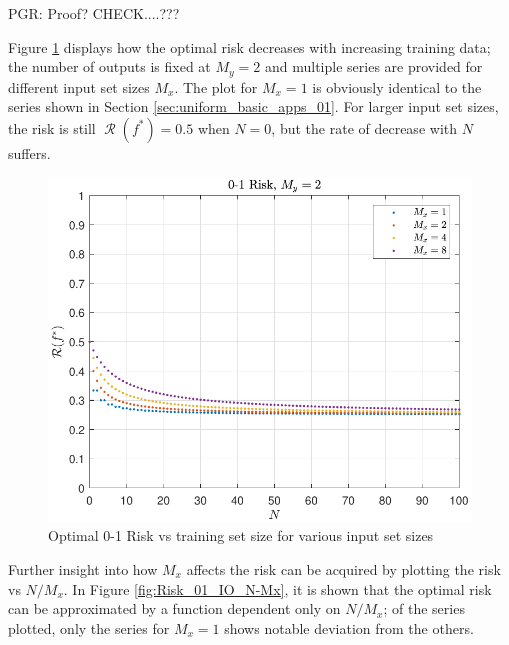 \documentclass[12pt]{report}
\DeclareMathOperator{\Rcal}{\mathcal{R}}
\begin{document}
PGR: Proof? CHECK....???



Figure \ref{fig:Risk_01_IO_N} displays how the optimal risk decreases with increasing training data; the number of outputs is fixed at $M_y = 2$ and multiple series are provided for different input set sizes $M_x$. The plot for $M_x = 1$ is obviously identical to the series shown in Section \ref{sec:uniform_basic_apps_01}. For larger input set sizes, the risk is still $\Rcal(f^*) = 0.5$ when $N = 0$, but the rate of decrease with $N$ suffers. 

\begin{figure}
\centering
\includegraphics[scale=1.0]{Risk_01_IO_N.pdf}
\caption{Optimal 0-1 Risk vs training set size for various input set sizes}
\label{fig:Risk_01_IO_N}
\end{figure}

Further insight into how $M_x$ affects the risk can be acquired by plotting the risk vs $N/M_x$. In Figure \ref{fig:Risk_01_IO_N-Mx}, it is shown that the optimal risk can be approximated by a function dependent only on $N/M_x$; of the series plotted, only the series for $M_x = 1$ shows notable deviation from the others.
\end{document}
